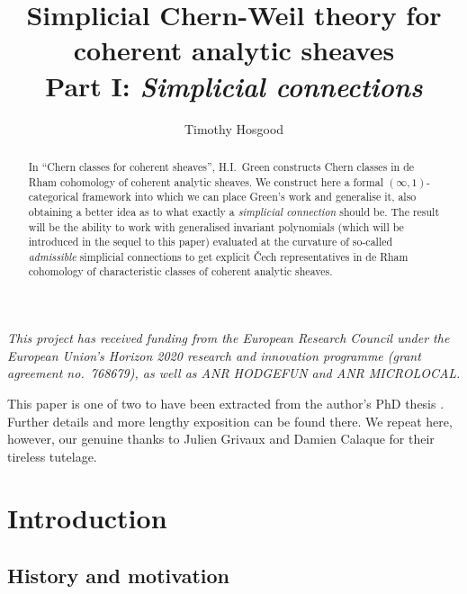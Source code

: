 \documentclass[11pt,fleqn]{article}
\title{Simplicial Chern-Weil theory for\\coherent analytic sheaves\\{\Large Part I: {\em Simplicial connections}}}
\author{Timothy Hosgood}
\theoremstyle{plain}
\theoremstyle{definition}
\theoremstyle{remark}
\numberwithin{equation}{theorem}
\begin{document}
\maketitle

\begin{abstract}
    In ``Chern classes for coherent sheaves'', H.I.~Green constructs Chern classes in de Rham cohomology of coherent analytic sheaves.
    We construct here a formal $(\infty,1)$-categorical framework into which we can place Green's work and generalise it, also obtaining a better idea as to what exactly a \emph{simplicial connection} should be.
    The result will be the ability to work with generalised invariant polynomials (which will be introduced in the sequel to this paper) evaluated at the curvature of so-called \emph{admissible} simplicial connections to get explicit Čech representatives in de Rham cohomology of characteristic classes of coherent analytic sheaves.
\end{abstract}

\tableofcontents

\bigskip

\begin{center}
    \emph{This project has received funding from the European Research Council under the European Union’s Horizon 2020 research and innovation programme (grant agreement no.~768679), as well as ANR HODGEFUN and ANR MICROLOCAL.}
\end{center}

\medskip

{This paper is one of two to have been extracted from the author's PhD thesis \cite{Hosgood2020}. Further details and more lengthy exposition can be found there. We repeat here, however, our genuine thanks to Julien Grivaux and Damien Calaque for their tireless tutelage.}


\section{Introduction}


    \subsection{History and motivation}
\end{document}

